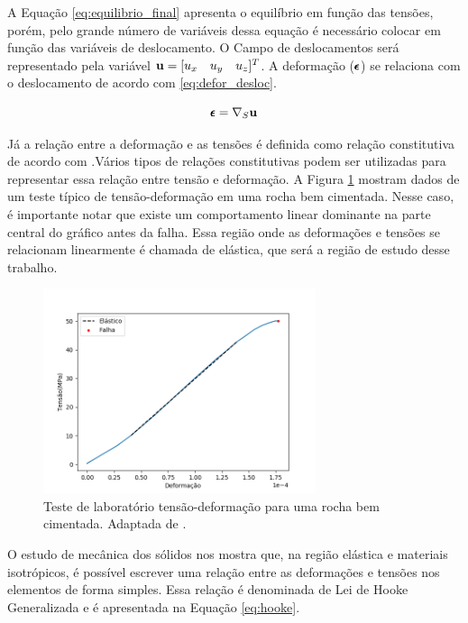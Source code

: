 A Equação \eqref{eq:equilibrio_final} apresenta o equilíbrio em função das tensões, porém, pelo grande número de variáveis dessa equação é necessário colocar em função das variáveis de deslocamento. O Campo de deslocamentos será representado pela variável $\mathbf{u} = [u_x \quad u_y \quad u_z]^T$. A deformação ($\pmb{\epsilon}$) se relaciona com o deslocamento de acordo com \eqref{eq:defor_desloc}. 

\begin{equation}
\label{eq:defor_desloc}
\pmb{\epsilon} = \nabla_S \mathbf{u}
\end{equation}


Já a relação entre a deformação e as tensões é definida como relação constitutiva de acordo com \citet{ResGeomec}.Vários tipos de relações constitutivas podem ser utilizadas para representar essa relação entre tensão e deformação. A Figura \ref{fig:stress_strain} mostram dados de um teste típico de tensão-deformação em uma rocha bem cimentada. Nesse caso, é importante notar que existe um comportamento linear dominante na parte central do gráfico antes da falha. Essa região onde as deformações e tensões se relacionam linearmente é chamada de elástica, que será a região de estudo desse trabalho. %


\begin{figure}[!htbp]
\centering
\includegraphics[width=8cm]{chap01/figs/stress_strain.png}
\caption{Teste de laboratório tensão-deformação para uma rocha bem cimentada. Adaptada de \citet{ResGeomec}.}
\label{fig:stress_strain}
\end{figure}


O estudo de mecânica dos sólidos nos mostra que, na região elástica e materiais isotrópicos, é possível escrever uma relação entre as deformações e tensões nos elementos de forma simples. Essa relação é denominada de Lei de Hooke Generalizada e é apresentada na Equação \eqref{eq:hooke}.


